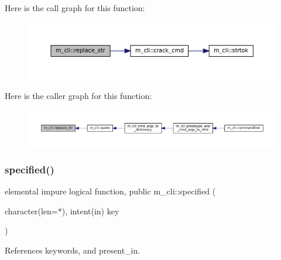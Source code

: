 Here is the call graph for this function\+:\nopagebreak
\begin{figure}[H]
\begin{center}
\leavevmode
\includegraphics[width=350pt]{namespacem__cli_a40e02b1c9fc580ddd410bb24017fab8c_cgraph}
\end{center}
\end{figure}
Here is the caller graph for this function\+:\nopagebreak
\begin{figure}[H]
\begin{center}
\leavevmode
\includegraphics[width=350pt]{namespacem__cli_a40e02b1c9fc580ddd410bb24017fab8c_icgraph}
\end{center}
\end{figure}
\mbox{\label{namespacem__cli_a3822e3acc1d6ae296f9f27a83cc1ca23}} 
\subsubsection{\texorpdfstring{specified()}{specified()}}
{\footnotesize\ttfamily elemental impure logical function, public m\+\_\+cli\+::specified (\begin{DoxyParamCaption}\item[{character(len=$\ast$), intent(in)}]{key }\end{DoxyParamCaption})}



References keywords, and present\+\_\+in.

\mbox{\label{namespacem__cli_a0015c38f9fa45a58ba6ae89f2ddb54f1}} 
